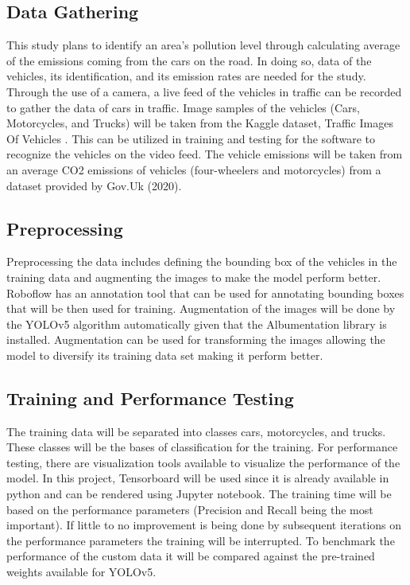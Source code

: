 \subsection {Data Gathering}
This study plans to identify an area’s pollution level through calculating average of the emissions coming from the cars on the road. In doing so, data of the vehicles, its identification, and its emission rates are needed for the study. Through the use of a camera, a live feed of the vehicles in traffic can be recorded to gather the data of cars in traffic. Image samples of the vehicles (Cars, Motorcycles, and Trucks) will be taken from the Kaggle dataset, Traffic Images Of Vehicles \cite{DVN/POREXF_2020}. This can be utilized in training and testing for the software to recognize the vehicles on the video feed. The vehicle emissions will be taken from an average CO2 emissions of vehicles (four-wheelers and motorcycles) from a dataset provided by Gov.Uk (2020). 

\subsection {Preprocessing}

	Preprocessing the data includes defining the bounding box of the vehicles in the training data and augmenting the images to make the model perform better. Roboflow has an annotation tool that can be used for annotating bounding boxes that will be then used for training. Augmentation of the images will be done by the YOLOv5 algorithm automatically given that the Albumentation library is installed. Augmentation can be used for transforming the images allowing the model to diversify its training data set making it perform better.\cite{dilmegani} 


\subsection {Training and Performance Testing}

The training data will be separated into classes cars, motorcycles, and trucks. These classes will be the bases of classification for the training.  For performance testing, there are visualization tools available to visualize the performance of the model. In this project, Tensorboard will be used since it is already available in python and can be rendered using Jupyter notebook. The training time will be based on the performance parameters (Precision and Recall being the most important). If little to no improvement is being done by subsequent iterations on the performance parameters the training will be interrupted. To benchmark the performance of the custom data it will be compared against the pre-trained weights available for YOLOv5. 

